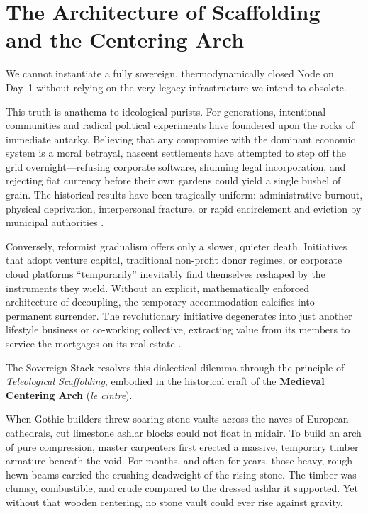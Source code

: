 \section{The Architecture of Scaffolding and the Centering Arch}
\label{sec:scaffolding_centering}

We cannot instantiate a fully sovereign, thermodynamically closed Node on Day~1 without relying on the very legacy infrastructure we intend to obsolete.

This truth is anathema to ideological purists. For generations, intentional communities and radical political experiments have foundered upon the rocks of immediate autarky. Believing that any compromise with the dominant economic system is a moral betrayal, nascent settlements have attempted to step off the grid overnight---refusing corporate software, shunning legal incorporation, and rejecting fiat currency before their own gardens could yield a single bushel of grain. The historical results have been tragically uniform: administrative burnout, physical deprivation, interpersonal fracture, or rapid encirclement and eviction by municipal authorities \parencite{kanter1972, christian2003}.

Conversely, reformist gradualism offers only a slower, quieter death. Initiatives that adopt venture capital, traditional non-profit donor regimes, or corporate cloud platforms ``temporarily'' inevitably find themselves reshaped by the instruments they wield. Without an explicit, mathematically enforced architecture of decoupling, the temporary accommodation calcifies into permanent surrender. The revolutionary initiative degenerates into just another lifestyle business or co-working collective, extracting value from its members to service the mortgages on its real estate \parencite{fisher2009}.

The Sovereign Stack resolves this dialectical dilemma through the principle of \textit{Teleological Scaffolding}, embodied in the historical craft of the \textbf{Medieval Centering Arch} (\textit{le cintre}).

When Gothic builders threw soaring stone vaults across the naves of European cathedrals, cut limestone ashlar blocks could not float in midair. To build an arch of pure compression, master carpenters first erected a massive, temporary timber armature beneath the void. For months, and often for years, those heavy, rough-hewn beams carried the crushing deadweight of the rising stone. The timber was clumsy, combustible, and crude compared to the dressed ashlar it supported. Yet without that wooden centering, no stone vault could ever rise against gravity.


